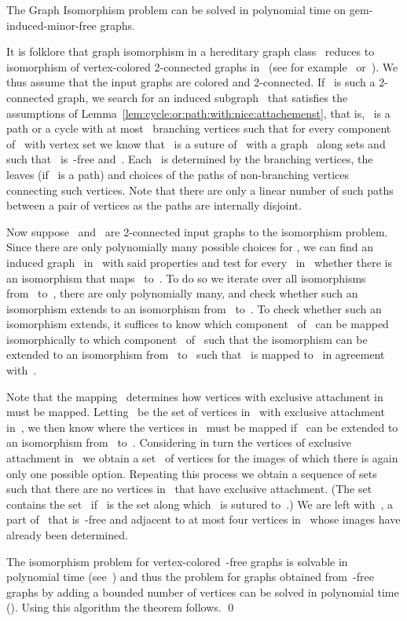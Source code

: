 \documentclass[envcountsame,envcountsect,11pt,a4paper]{llncs}
\renewenvironment{proof}{\begin{Proof}}{\qed\end{Proof}}
\begin{document}
\begin{theorem}
\label{thm:gem:iso}
The {\sc Graph Isomorphism} problem can be solved in polynomial time on gem-induced-minor-free graphs.
\end{theorem}

\begin{proof}
It is folklore that graph isomorphism in a hereditary graph class~ reduces to isomorphism of vertex-colored 2-connected graphs in~ (see for example~\cite{DBLP:conf/coco/DattaLNTW09} or~\cite{OtachiS14}).
We thus assume that the input graphs are colored and 2-connected. 
If~ is such a 2-connected graph, we search for an induced subgraph~ that satisfies the assumptions of
Lemma~\ref{lem:cycle:or:path:with:nice:attachemenst}, that is,~ is a
path or a cycle with at most~ branching vertices such that for every
component of~ with vertex set  we know that~ is a
suture of~
with a graph~ along sets  and  such that~ is~-free and~.
Each~ is determined by the branching vertices, the leaves (if~ is a path) and
choices of the paths of non-branching vertices connecting such vertices.
Note that there are only a linear number of such paths between a pair of vertices as the paths are internally disjoint.
 
Now suppose~ and~ are 2-connected input graphs to the isomorphism problem.
Since there are only polynomially many possible choices for ,
we can find an induced graph~ in~ with said properties and test for every~ in~ whether there is an isomorphism that maps~ to~.
To do so we iterate over all isomorphisms~ from~ to~,
there are only polynomially many, and check whether such an isomorphism extends to an isomorphism from~ to~.
To check whether such an isomorphism extends,
it suffices to know which component~ of~ can be mapped isomorphically to which component~ of~
such that the isomorphism can be extended to an isomorphism from~ to~
such that~ is mapped to~ in agreement with~.

Note that the mapping~ determines how vertices with exclusive attachment in~ must be mapped. Letting~ be the set of
vertices in~ with exclusive attachment in~, we then know where the vertices in~ must be mapped
if~ can be extended to an isomorphism from~ to~. Considering in turn the vertices of exclusive attachment in~ we obtain a set~ of vertices for the images of which there is again only one possible option.
Repeating this process we obtain a sequence of sets~ such that there are no vertices in~
that have exclusive attachment. (The set~ contains the set~ if~ is the set along which~
is sutured to~.)
We are left with~, a part of~ that is~-free and adjacent to at most four vertices in~ whose images have already been determined.


The isomorphism problem for vertex-colored~-free graphs is solvable in polynomial time (see~\cite{stacsSchweitzer}) and thus the problem for graphs obtained from~-free graphs by adding a bounded number of vertices can be solved in polynomial time (\cite[Theorem 1]{DBLP:conf/swat/KratschS10}).
Using this algorithm the theorem follows.
\end{proof}
\end{document}
